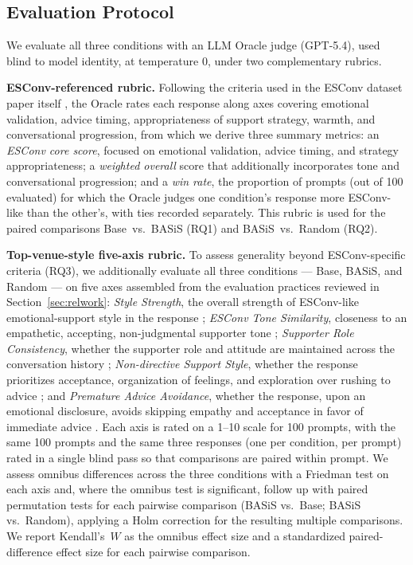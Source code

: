\documentclass[manuscript,review,anonymous]{acmart}
\begin{document}
\subsection{Evaluation Protocol}
\label{sec:evalprotocol}
We evaluate all three conditions with an LLM Oracle judge (GPT-5.4), used blind to model identity, at temperature $0$, under two complementary rubrics.

\textbf{ESConv-referenced rubric.} Following the criteria used in the ESConv dataset paper itself \cite{liu2021esconv}, the Oracle rates each response along axes covering emotional validation, advice timing, appropriateness of support strategy, warmth, and conversational progression, from which we derive three summary metrics: an \emph{ESConv core score}, focused on emotional validation, advice timing, and strategy appropriateness; a \emph{weighted overall} score that additionally incorporates tone and conversational progression; and a \emph{win rate}, the proportion of prompts (out of 100 evaluated) for which the Oracle judges one condition's response more ESConv-like than the other's, with ties recorded separately. This rubric is used for the paired comparisons Base~vs.~BASiS (RQ1) and BASiS~vs.~Random (RQ2).

\textbf{Top-venue-style five-axis rubric.} To assess generality beyond ESConv-specific criteria (RQ3), we additionally evaluate all three conditions --- Base, BASiS, and Random --- on five axes assembled from the evaluation practices reviewed in Section~\ref{sec:relwork}: \emph{Style Strength}, the overall strength of ESConv-like emotional-support style in the response \cite{mir2019styletransfer}; \emph{ESConv Tone Similarity}, closeness to an empathetic, accepting, non-judgmental supporter tone \cite{liu2021esconv}; \emph{Supporter Role Consistency}, whether the supporter role and attitude are maintained across the conversation history \cite{zhang2018persona}; \emph{Non-directive Support Style}, whether the response prioritizes acceptance, organization of feelings, and exploration over rushing to advice \cite{deng2023mixedinitiative}; and \emph{Premature Advice Avoidance}, whether the response, upon an emotional disclosure, avoids skipping empathy and acceptance in favor of immediate advice \cite{liu2021esconv,deng2023mixedinitiative}. Each axis is rated on a 1--10 scale for 100 prompts, with the same 100 prompts and the same three responses (one per condition, per prompt) rated in a single blind pass so that comparisons are paired within prompt. We assess omnibus differences across the three conditions with a Friedman test on each axis and, where the omnibus test is significant, follow up with paired permutation tests for each pairwise comparison (BASiS vs.\ Base; BASiS vs.\ Random), applying a Holm correction for the resulting multiple comparisons. We report Kendall's~$W$ as the omnibus effect size and a standardized paired-difference effect size for each pairwise comparison.
\end{document}
